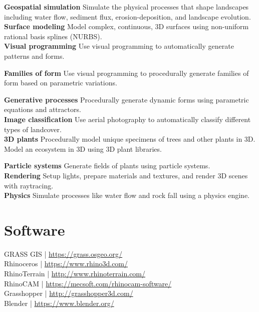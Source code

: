 \documentclass[11pt,article,oneside]{memoir}
\begin{document}
\noindent \textbf{Geospatial simulation}
Simulate the physical processes that shape landscapes including
water flow, sediment flux, erosion-deposition, and landscape evolution.\\

\noindent \textbf{Surface modeling}
Model complex, continuous, 3D surfaces 
using non-uniform rational basis splines (NURBS).\\

\noindent \textbf{Visual programming}
Use visual programming to automatically generate
patterns and forms.
%
\nocite{*} \printbibliography[keyword=algorithmic, heading=none]
\vspace*{0.5em}

\noindent \textbf{Families of form}
Use visual programming to procedurally generate families of form
based on parametric variations.
%
\nocite{*} \printbibliography[keyword=procedural, heading=none]
\vspace*{0.5em}

\noindent \textbf{Generative processes}
Procedurally generate dynamic forms using 
parametric equations and attractors.\\

\noindent \textbf{Image classification}
Use aerial photography to automatically classify 
different types of landcover.\\

\noindent \textbf{3D plants}
Procedurally model unique specimens 
of trees and other plants in 3D.
Model an ecosystem in 3D using 3D plant libraries.
%
\nocite{*} \printbibliography[keyword=plants, heading=none]
\vspace*{0.5em}

\noindent \textbf{Particle systems}
Generate fields of plants 
using particle systems. \\

\noindent \textbf{Rendering}
Setup lights, prepare materials and textures, 
and render 3D scenes with raytracing.\\

\noindent \textbf{Physics}
Simulate processes like water flow and rock fall
using a physics engine.\\


\section{Software}
GRASS GIS | \url{https://grass.osgeo.org/} \\
Rhinoceros | \url{https://www.rhino3d.com/}\\
RhinoTerrain | \url{http://www.rhinoterrain.com/}\\
RhinoCAM | \url{https://mecsoft.com/rhinocam-software/}\\
Grasshopper | \url{http://grasshopper3d.com/}\\
Blender | \url{https://www.blender.org/}\\
\end{document}
